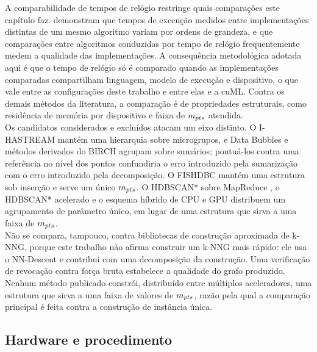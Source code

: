 A comparabilidade de tempos de relógio restringe quais comparações este capítulo faz.  demonstram que tempos de execução medidos entre implementações distintas de um mesmo algoritmo variam por ordens de grandeza, e que comparações entre algoritmos conduzidas por tempo de relógio frequentemente medem a qualidade das implementações. A consequência metodológica adotada aqui é que o tempo de relógio só é comparado quando as implementações comparadas compartilham linguagem, modelo de execução e dispositivo, o que vale entre as configurações deste trabalho e entre elas e a cuML. Contra os demais métodos da literatura, a comparação é de propriedades estruturais, como residência de memória por dispositivo e faixa de $m_{pts}$ atendida.\\

Os candidatos considerados e excluídos atacam um eixo distinto. O I-HASTREAM \cite{ihastream} mantém uma hierarquia sobre microgrupos, e Data Bubbles \cite{databubbles} e métodos derivados do BIRCH \cite{birch} agrupam sobre sumários; pontuá-los contra uma referência no nível dos pontos confundiria o erro introduzido pela sumarização com o erro introduzido pela decomposição. O FISHDBC \cite{fishdbc} mantém uma estrutura sob inserção e serve um único $m_{pts}$. O \ac{HDBSCAN*} sobre MapReduce \cite{mrhdbscan}, o \ac{HDBSCAN*} acelerado \cite{acceleratedhdbscan} e o esquema híbrido de \ac{CPU} e \ac{GPU} \cite{bpshdbscan} distribuem um agrupamento de parâmetro único, em lugar de uma estrutura que sirva a uma faixa de $m_{pts}$.\\

Não se compara, tampouco, contra bibliotecas de construção aproximada de \ac{k-NNG}, porque este trabalho não afirma construir um \ac{k-NNG} mais rápido: ele usa o NN-Descent \cite{nndescent, dynamic_nndescent} e contribui com uma decomposição da construção. Uma verificação de revocação contra força bruta estabelece a qualidade do grafo produzido.\\

Nenhum método publicado constrói, distribuído entre múltiplos aceleradores, uma estrutura que sirva a uma faixa de valores de $m_{pts}$, razão pela qual a comparação principal é feita contra a construção de instância única.\\

\subsection{Hardware e procedimento\label{sec:hardware}}

